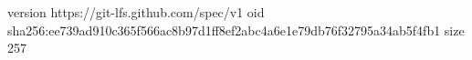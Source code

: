 version https://git-lfs.github.com/spec/v1
oid sha256:ee739ad910c365f566ac8b97d1ff8ef2abc4a6e1e79db76f32795a34ab5f4fb1
size 257
